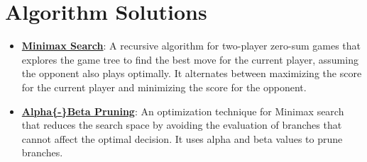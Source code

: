 \documentclass{article}%
\begin{document}
%
\section{Algorithm Solutions}%
\label{sec:AlgorithmSolutions}%
\begin{itemize}[leftmargin=*]%
\item \href{https://purdue.brightspace.com/d2l/common/assets/pdfjs-d2l-dist/1.0.14-legacy/web/viewer.html?file=\%2Fcontent\%2Fenforced\%2F1095467-wl.202510.CS.24300.001\%2F02L2-Intro.pdf\%3Fou\%3D1095467\&lang=en-us\&container=d2l-fileviewer-rendered-pdf\&fullscreen=d2l-fileviewer-rendered-pdf-dialog\&height=667#page=22}{\textbf{Minimax Search}}: A recursive algorithm for two{-}player zero{-}sum games that explores the game tree to find the best move for the current player, assuming the opponent also plays optimally. It alternates between maximizing the score for the current player and minimizing the score for the opponent.%
\item \href{https://purdue.brightspace.com/d2l/common/assets/pdfjs-d2l-dist/1.0.14-legacy/web/viewer.html?file=\%2Fcontent\%2Fenforced\%2F1095467-wl.202510.CS.24300.001\%2F02L2-Intro.pdf\%3Fou\%3D1095467\&lang=en-us\&container=d2l-fileviewer-rendered-pdf\&fullscreen=d2l-fileviewer-rendered-pdf-dialog\&height=667#page=23}{\textbf{Alpha\{{-}\}Beta Pruning}}: An optimization technique for Minimax search that reduces the search space by avoiding the evaluation of branches that cannot affect the optimal decision. It uses alpha and beta values to prune branches.%
\end{itemize}%
\end{document}
